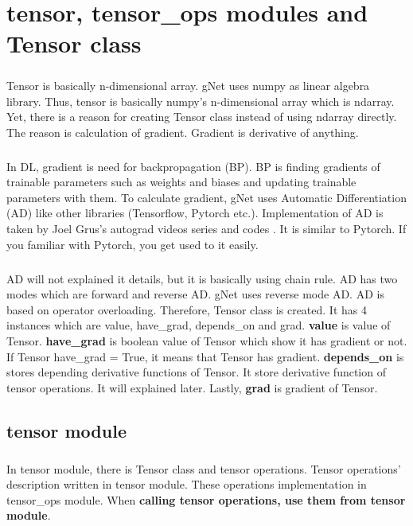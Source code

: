 \documentclass[12pt]{report}
\begin{document}
\chapter{tensor, tensor\_ops modules and Tensor class}

\paragraph{}
Tensor is basically n-dimensional array. gNet uses numpy as linear algebra library. Thus, tensor is basically numpy's n-dimensional array which is ndarray. Yet, there is a reason for creating Tensor class instead of using ndarray directly. The reason is calculation of gradient. Gradient is derivative of anything. 

\paragraph{}
In DL, gradient is need for backpropagation (BP). BP is finding gradients of trainable parameters such as weights and biases and updating trainable parameters with them. To calculate gradient, gNet uses Automatic Differentiation (AD) \cite{AD_savine} like other libraries (Tensorflow, Pytorch etc.). Implementation of AD is taken by Joel Grus's autograd videos series and codes \cite{Joel_Grus}. It is similar to Pytorch. If you familiar with Pytorch, you get used to it easily. 

\paragraph{} 
AD will not explained it details, but it is basically using chain rule. AD has two modes which are forward and reverse AD. gNet uses reverse mode AD. AD is based on operator overloading. Therefore, Tensor class is created. It has 4 instances which are value, have\_grad, depends\_on and grad. \textbf{value} is value of Tensor. \textbf{have\_grad} is boolean value of Tensor which show it has gradient or not. If Tensor have\_grad = True, it means that Tensor has gradient. \textbf{depends\_on} is stores depending derivative functions of Tensor. It store derivative function of tensor operations. It will explained later. Lastly, \textbf{grad} is gradient of Tensor.

\section{tensor module}
\paragraph{}
In tensor module, there is Tensor class and tensor operations. Tensor operations' description written in tensor module. These operations implementation in tensor\_ops module. When \textbf{calling tensor operations, use them from tensor module}.
\end{document}
